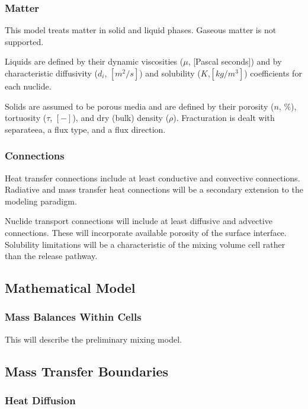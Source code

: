 \subsubsection{Matter}

This model treats matter in solid and liquid phases. Gaseous matter is not 
supported. 


Liquids are defined by their dynamic viscosities ($\mu$, [Pascal seconds]) and
by characteristic diffusivity ($d_i$, $[m^2/s]$) and solubility ($K$,$[kg/m^3]$) 
coefficients for each nuclide.  


Solids are assumed to be porous media and are defined by their porosity 
($n$, $\%$), tortuosity ($\tau$, $[-]$), and dry (bulk) density ($\rho$). 
Fracturation is dealt with separateea, a flux type, and a flux 
direction.  

\subsubsection{Connections}

Heat transfer connections include at least conductive and convective connections. 
Radiative and mass transfer heat connections will be a secondary extension to 
the modeling paradigm. 

Nuclide transport connections will include at least diffusive and advective 
connections. These will incorporate available porosity of the surface interface. 
Solubility limitations will be a characteristic of the mixing volume cell rather  
than the release pathway. 

\subsection{Mathematical Model}

\subsubsection{Mass Balances Within Cells}

This will describe the preliminary mixing model.

\subsection{Mass Transfer Boundaries}

\subsubsection{Heat Diffusion}

